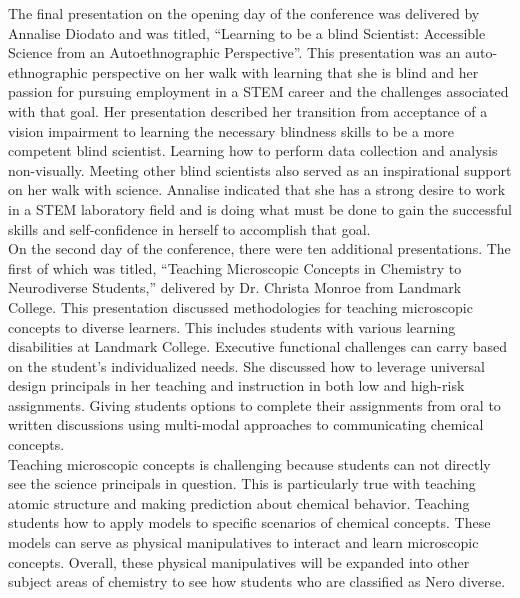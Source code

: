 \documentclass[11pt]{sig-alternate}
\begin{document}
\begin{large}
The final presentation on the opening day of the conference was delivered by Annalise Diodato and was titled, “Learning to be a blind Scientist: Accessible Science from an Autoethnographic Perspective”. This presentation was an auto-ethnographic perspective on her walk with learning that she is blind and her passion for pursuing employment in a STEM career and the challenges associated with that goal. Her presentation described her transition from acceptance of a vision impairment to learning the necessary blindness skills to be a more competent blind scientist. Learning how to perform data collection and analysis non-visually. Meeting other blind scientists also served as an inspirational support on her walk with science. Annalise indicated that she has a strong desire to work in a STEM laboratory field and is doing what must be done to gain the successful skills and self-confidence in herself to accomplish that goal.\\

On the second day of the conference, there were ten additional presentations. The first of which was titled, “Teaching Microscopic Concepts in Chemistry to Neurodiverse Students,” delivered by Dr. Christa Monroe from Landmark College. This presentation discussed meth\-odologies for teaching microscopic concepts to diverse learners. This includes students with various learning disabilities at Landmark College. Executive functional challenges can carry based on the student’s individualized needs. She discussed how to leverage universal design principals in her teaching and instruction in both low and high-risk assignments. Giving students options to complete their assignments from oral to written discussions using multi-modal approaches to communicating chemical concepts.\\

Teaching microscopic concepts is challenging because students can not directly see the science principals in question. This is particularly true with teaching atomic structure and making prediction about chemical behavior. Teaching students how to apply models to specific scenarios of chemical concepts. These models can serve as physical manipulatives to interact and learn microscopic concepts. Overall, these physical manipulatives will be expanded into other subject areas of chemistry to see how students who are classified as Nero diverse.\\


\end{large}
\end{document}
